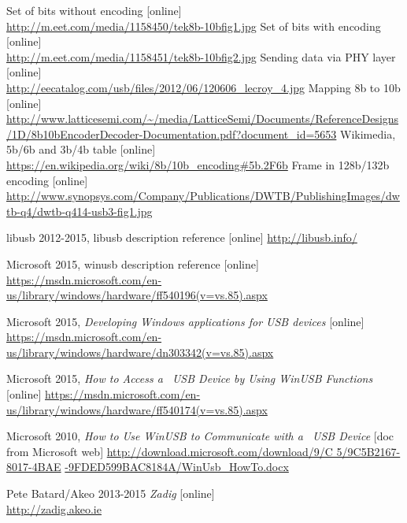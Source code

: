 \documentclass{BscUS}
\begin{document}
\begin{thebibliography}{1}
 Set of bits without encoding [online] \\
\url{http://m.eet.com/media/1158450/tek8b-10bfig1.jpg}
 Set of bits with encoding [online] \\
\url{http://m.eet.com/media/1158451/tek8b-10bfig2.jpg}
 Sending data via PHY layer [online] \\
\url{http://eecatalog.com/usb/files/2012/06/120606_lecroy_4.jpg}
 Mapping 8b to 10b [online] \\
\url{http://www.latticesemi.com/~/media/LatticeSemi/Documents/ReferenceDesigns/1D/8b10bEncoderDecoder-Documentation.pdf?document_id=5653}
 Wikimedia, 5b/6b and 3b/4b table [online] \\
\url{https://en.wikipedia.org/wiki/8b/10b_encoding#5b.2F6b}
 Frame in 128b/132b encoding [online] \\
\url{http://www.synopsys.com/Company/Publications/DWTB/PublishingImages/dwtb-q4/dwtb-q414-usb3-fig1.jpg}

 libusb 2012-2015, libusb description reference [online]
\newline 
\url{http://libusb.info/}

 Microsoft 2015, winusb description reference [online]
\newline 
\url{https://msdn.microsoft.com/en-us/library/windows/hardware/ff540196(v=vs.85).aspx}


 Microsoft 2015, {\em Developing Windows applications for USB devices} [online]
\newline 
\url{https://msdn.microsoft.com/en-us/library/windows/hardware/dn303342(v=vs.85).aspx}

 Microsoft 2015, {\em How to Access a~ USB Device by Using WinUSB Functions} [online]
\newline 
\url{https://msdn.microsoft.com/en-us/library/windows/hardware/ff540174(v=vs.85).aspx}

 Microsoft 2010, {\em How to Use WinUSB to Communicate with a~ USB Device} [doc from Microsoft web]
\newline 
\url{http://download.microsoft.com/download/9/C 5/9C5B2167-8017-4BAE} 
\newline 
\url{-9FDED599BAC8184A/WinUsb_HowTo.docx}

 Pete Batard/Akeo 2013-2015 {\em Zadig} [online] \\
\url{http://zadig.akeo.ie}


\end{thebibliography}
\end{document}

